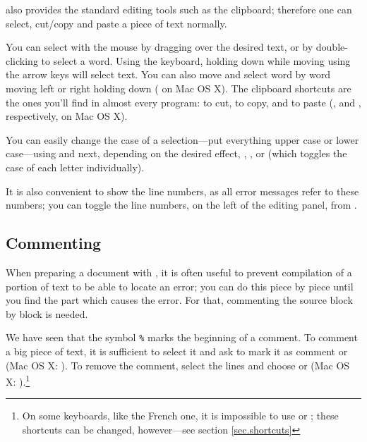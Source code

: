 {\Tw} also provides the standard editing tools such as the clipboard; therefore one can select, cut/copy and paste a piece of text normally.

You can select with the mouse by dragging over the desired text, or by  double-clicking to select a word. Using the keyboard, holding down  while moving using the arrow keys will select text. You can also move and select word by word moving left or right holding  down ( on Mac OS X). The clipboard shortcuts are the ones you'll find in almost every program:  to cut,  to copy, and  to paste (,  and , respectively, on Mac OS X).

You can easily change the case of a selection---put everything upper case or lower case---using \submenu{} and next, depending on the desired effect, , , or  (which toggles the case of each letter individually).

It is also convenient to show the line numbers, as all error messages refer to these numbers; you can toggle the line numbers, on the left of the editing panel, from \submenu{}.

\subsection{Commenting}

When preparing a document with {\AllTeX}, it is often useful to prevent compilation of a portion of text to be able to locate an error; you can do this piece by piece until you find the part which causes the error. For that, commenting the source block by block is needed. 

We have seen that the symbol \verb+%+ marks the beginning of a comment.
To comment a big piece of text, it is sufficient to select it and ask to mark it as comment \submenu{} or \keysequence{Ctrl+Shift+]} (Mac OS X: \keysequence{Cmd+Shift+]}). To remove the comment, select the lines and choose \submenu{} or \keysequence{Ctrl+Shift+[} (Mac OS X: \keysequence{Cmd+Shift+[}).\footnote{On some keyboards, like the French one, it is impossible to use \keysequence{Ctrl+Shift+[} or \keysequence{Ctrl+Shift+]}; these shortcuts can be changed, however---see section \ref{sec.shortcuts}}

